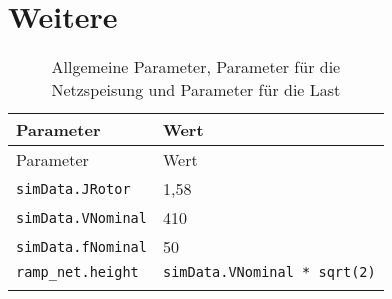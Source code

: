 \section{Weitere}\label{weitere}

\begin{longtable}[]{@{}ll@{}}
\caption{Allgemeine Parameter, Parameter für die Netzspeisung und
Parameter für die Last}\tabularnewline
\toprule
\begin{minipage}[b]{0.31\columnwidth}\raggedright
Parameter\strut
\end{minipage} & \begin{minipage}[b]{0.63\columnwidth}\raggedright
Wert\strut
\end{minipage}\tabularnewline
\midrule
\endfirsthead
\toprule
\begin{minipage}[b]{0.31\columnwidth}\raggedright
Parameter\strut
\end{minipage} & \begin{minipage}[b]{0.63\columnwidth}\raggedright
Wert\strut
\end{minipage}\tabularnewline
\midrule
\endhead
\begin{minipage}[t]{0.31\columnwidth}\raggedright
\texttt{simData.JRotor}\strut
\end{minipage} & \begin{minipage}[t]{0.63\columnwidth}\raggedright
1,58\strut
\end{minipage}\tabularnewline
\begin{minipage}[t]{0.31\columnwidth}\raggedright
\texttt{simData.VNominal}\strut
\end{minipage} & \begin{minipage}[t]{0.63\columnwidth}\raggedright
410\strut
\end{minipage}\tabularnewline
\begin{minipage}[t]{0.31\columnwidth}\raggedright
\texttt{simData.fNominal}\strut
\end{minipage} & \begin{minipage}[t]{0.63\columnwidth}\raggedright
50\strut
\end{minipage}\tabularnewline
\begin{minipage}[t]{0.31\columnwidth}\raggedright
\texttt{ramp\_net.height}\strut
\end{minipage} & \begin{minipage}[t]{0.63\columnwidth}\raggedright
\texttt{simData.VNominal\ *\ sqrt(2)}\strut
\end{minipage}\tabularnewline
\begin{minipage}[t]{0.31\columnwidth}\raggedright

\end{minipage}
\end{longtable}
